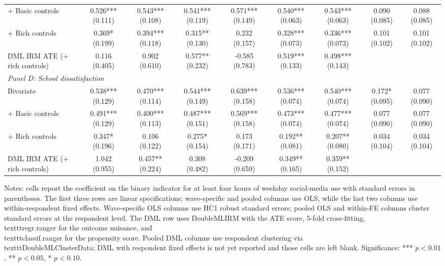 \begin{table}[!htbp]
{\begin{tabular}{lcccccccc}
\\
+ Basic controls & 0.526*** (0.111) & 0.543*** (0.108) & 0.541*** (0.119) & 0.571*** (0.149) & 0.540*** (0.063) & 0.543*** (0.063) & 0.090 (0.085) & 0.088 (0.085)
\\
+ Rich controls & 0.369* (0.199) & 0.394*** (0.118) & 0.315** (0.130) & 0.232 (0.157) & 0.328*** (0.073) & 0.336*** (0.073) & 0.101 (0.102) & 0.101 (0.102)
\\
DML IRM ATE (+ rich controls) & 0.116 (0.405) & 0.902 (0.610) & 0.577** (0.232) & -0.585 (0.783) & 0.519*** (0.133) & 0.498*** (0.143) &  & 
\\
\hline
\multicolumn{9}{l}{\textit{Panel D: School dissatisfaction}} \\
\hline
Bivariate & 0.538*** (0.129) & 0.470*** (0.114) & 0.544*** (0.149) & 0.639*** (0.158) & 0.536*** (0.074) & 0.540*** (0.074) & 0.172* (0.095) & 0.077 (0.090)
\\
+ Basic controls & 0.491*** (0.129) & 0.400*** (0.113) & 0.487*** (0.151) & 0.569*** (0.158) & 0.473*** (0.074) & 0.477*** (0.074) & 0.077 (0.090) & 0.077 (0.090)
\\
+ Rich controls & 0.347* (0.196) & 0.106 (0.122) & 0.275* (0.154) & 0.173 (0.171) & 0.192** (0.081) & 0.207** (0.080) & 0.034 (0.104) & 0.034 (0.104)
\\
DML IRM ATE (+ rich controls) & 1.042 (0.955) & 0.457** (0.224) & 0.308 (0.482) & -0.209 (0.659) & 0.349** (0.165) & 0.359** (0.152) &  & 
\\
\hline
\end{tabular}
}
\begin{minipage}{0.95\textwidth}
\footnotesize Notes: cells report the coefficient on the binary indicator for at least four hours of weekday social-media use with standard errors in parentheses. The first three rows are linear specifications; wave-specific and pooled columns use OLS, while the last two columns use within-respondent fixed effects. Wave-specific OLS columns use HC1 robust standard errors; pooled OLS and within-FE columns cluster standard errors at the respondent level. The DML row uses DoubleMLIRM with the ATE score, 5-fold cross-fitting, \\texttt{regr.ranger} for the outcome nuisance, and \\texttt{classif.ranger} for the propensity score. Pooled DML columns use respondent clustering via \\texttt{DoubleMLClusterData}; DML with respondent fixed effects is not yet reported and those cells are left blank. Significance: *** \(p < 0.01\), ** \(p < 0.05\), * \(p < 0.10\).
\end{minipage}
\end{table}
